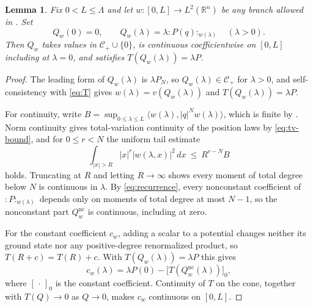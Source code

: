 \documentclass[11pt,reqno]{amsart}
\theoremstyle{plain}
\newtheorem{lemma}[theorem]{Lemma}
\theoremstyle{definition}
\theoremstyle{remark}
\numberwithin{equation}{section}
\begin{document}
\begin{lemma}
  \label{lem:Qw-continuous}
  Fix $0<L\le\Lambda$ and let $w:[0,L]\to L^2(\mathbb R^n)$ be any branch
  allowed in . Set
  \begin{equation}
    \label{eq:Qw}
    Q_w(0)=0,
    \qquad
    Q_w(\lambda)=\lambda:P(q):_{w(\lambda)}\quad(\lambda>0).
  \end{equation}
  Then $Q_w$ takes values in $\mathcal C_+\cup\{0\}$, is continuous
  coefficientwise on $[0,L]$ including at $\lambda=0$, and satisfies
  $T(Q_w(\lambda))=\lambda P$.
\end{lemma}

\begin{proof}
  The leading form of $Q_w(\lambda)$ is $\lambda P_N$, so
  $Q_w(\lambda)\in\mathcal C_+$ for $\lambda>0$, and self-consistency with
  \eqref{eq:T} gives $w(\lambda)=v(Q_w(\lambda))$ and
  $T(Q_w(\lambda))=\lambda P$.

  For continuity, write
  $B=\sup_{0\le\lambda\le L}\langle w(\lambda),|q|^Nw(\lambda)\rangle$, which
  is finite by . Norm continuity gives total-variation
  continuity of the position laws by \eqref{eq:tv-bound}, and for
  $0\le r<N$ the uniform tail estimate
  \begin{equation}
    \label{eq:tail}
    \int_{|x|>R}|x|^r|w(\lambda,x)|^2\,dx\ \le\ R^{r-N}B
  \end{equation}
  holds. Truncating at $R$ and letting $R\to\infty$ shows every moment of
  total degree below $N$ is continuous in $\lambda$. By
  \eqref{eq:recurrence}, every nonconstant coefficient of
  $:P:_{w(\lambda)}$ depends only on moments of total degree at most $N-1$,
  so the nonconstant part $Q_w^{\mathrm{nc}}$ is continuous, including at
  zero.

  For the constant coefficient $c_w$, adding a scalar to a potential changes
  neither its ground state nor any positive-degree renormalized product, so
  $T(R+c)=T(R)+c$. With $T(Q_w(\lambda))=\lambda P$ this gives
  \begin{equation}
    \label{eq:cw}
    c_w(\lambda)=\lambda P(0)-\bigl[T(Q_w^{\mathrm{nc}}(\lambda))\bigr]_0,
  \end{equation}
  where $[\,\cdot\,]_0$ is the constant coefficient. Continuity of $T$ on the
  cone, together with $T(Q)\to0$ as $Q\to0$, makes $c_w$ continuous on
  $[0,L]$.
\end{proof}
\end{document}
